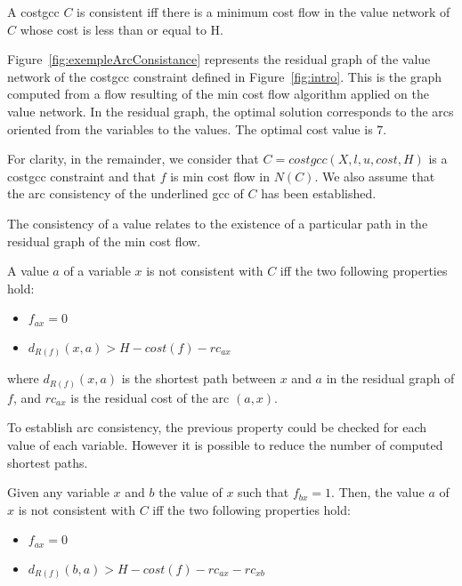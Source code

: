  

\begin{property}
A costgcc $C$ is consistent iff there is a minimum cost flow in the value network of $C$ whose cost is less than or equal to H.
\end{property}

Figure~\ref{fig:exempleArcConsistance} represents the residual graph of the value network of the costgcc constraint defined in Figure~\ref{fig:intro}. 
This is the graph computed from a flow resulting of the min cost flow algorithm applied on the value network.
In the residual graph, the optimal solution corresponds to the arcs oriented from the variables to the values.
The optimal cost value is $7$.

For clarity, in the remainder, we consider that $C=costgcc(X, l, u, cost, H)$ is a costgcc constraint and that $f$ is min cost flow in $N(C)$. We also assume that the arc consistency of the underlined gcc of $C$ has been established.

The consistency of a value relates to the existence of a particular path in the residual graph of the min cost flow.
\begin{property}\label{acxpte}
    A value $a$ of a variable $x$ is not consistent with $C$ iff the two following properties hold:
    \begin{itemize}
        \item $f_{ax} = 0$
        \item $d_{R(f)}(x, a) > H - cost(f) - rc_{ax}$
    \end{itemize}
    where $d_{R(f)}(x, a)$ is the shortest path between $x$ and $a$ in the residual graph of $f$, and $rc_{ax}$ is the residual cost of the arc $(a, x)$.
    \label{property:Regin}
\end{property}

To establish arc consistency, the previous property could be checked for each value of each variable. However it is possible to reduce the number of computed shortest paths.
    \begin{corollary}\label{acpte}
        Given any variable $x$ and $b$ the value of $x$ such that $f_{bx} = 1$. Then, the value $a$ of $x$ is not consistent with $C$ iff the two following properties hold:
        \begin{itemize}
            \item $f_{ax} = 0$
            \item $d_{R(f)} (b, a) > H - cost(f) - rc_{ax} - rc_{xb}$
        \end{itemize}
    \end{corollary}


